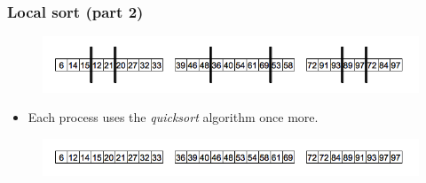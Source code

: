 \documentclass{beamer}
\begin{document}
\begin{frame}
	\frametitle{Local sort (part 2)}
	\begin{figure}
		\begin{center}
			\includegraphics[width=\textwidth]{images/07trade.png}
		\end{center}
	\end{figure}
	
	\pause
	\begin{itemize}
		\item{Each process uses the \textit{quicksort} algorithm once more.}
	\end{itemize}
	
	\begin{figure}
		\begin{center}
			\includegraphics[width=\textwidth]{images/08localorder2.png}
		\end{center}
	\end{figure}
\end{frame}
\end{document}
